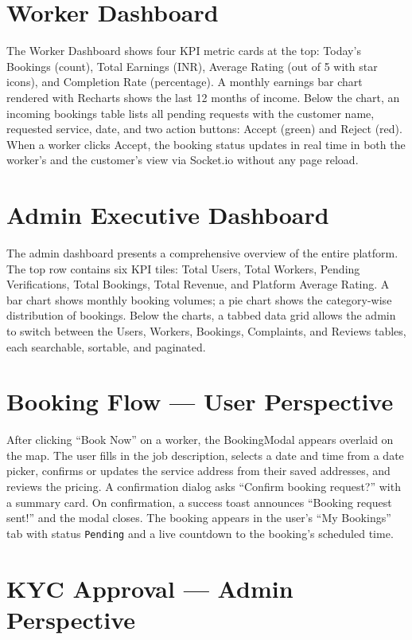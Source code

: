 \documentclass[12pt,a4paper]{report}
\begin{document}
\section{Worker Dashboard}

The Worker Dashboard shows four KPI metric cards at the top: Today's Bookings (count), Total Earnings (INR), Average Rating (out of 5 with star icons), and Completion Rate (percentage). A monthly earnings bar chart rendered with Recharts shows the last 12 months of income. Below the chart, an incoming bookings table lists all pending requests with the customer name, requested service, date, and two action buttons: Accept (green) and Reject (red). When a worker clicks Accept, the booking status updates in real time in both the worker's and the customer's view via Socket.io without any page reload.

\section{Admin Executive Dashboard}

The admin dashboard presents a comprehensive overview of the entire platform. The top row contains six KPI tiles: Total Users, Total Workers, Pending Verifications, Total Bookings, Total Revenue, and Platform Average Rating. A bar chart shows monthly booking volumes; a pie chart shows the category-wise distribution of bookings. Below the charts, a tabbed data grid allows the admin to switch between the Users, Workers, Bookings, Complaints, and Reviews tables, each searchable, sortable, and paginated.

\section{Booking Flow — User Perspective}

After clicking ``Book Now'' on a worker, the BookingModal appears overlaid on the map. The user fills in the job description, selects a date and time from a date picker, confirms or updates the service address from their saved addresses, and reviews the pricing. A confirmation dialog asks ``Confirm booking request?'' with a summary card. On confirmation, a success toast announces ``Booking request sent!'' and the modal closes. The booking appears in the user's ``My Bookings'' tab with status \texttt{Pending} and a live countdown to the booking's scheduled time.

\section{KYC Approval — Admin Perspective}
\end{document}
